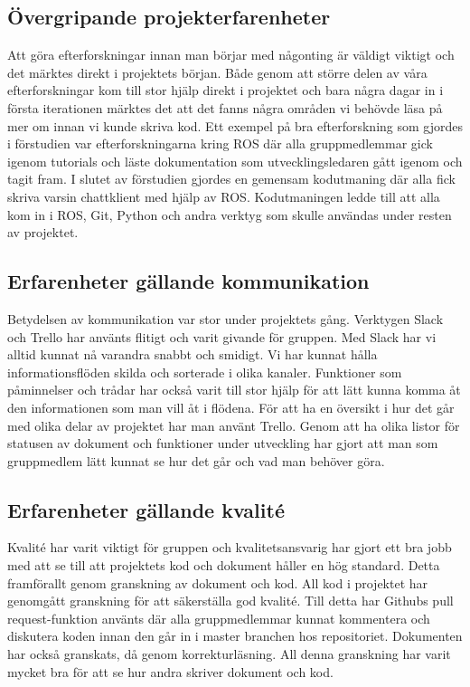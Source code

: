 \subsection{Övergripande projekterfarenheter}

Att göra efterforskningar innan man börjar med någonting är väldigt viktigt och det märktes direkt i projektets början. Både genom att större delen av våra efterforskningar kom till stor hjälp direkt i projektet och bara några dagar in i första iterationen märktes det att det fanns några områden vi behövde läsa på mer om innan vi kunde skriva kod. Ett exempel på bra efterforskning som gjordes i förstudien var efterforskningarna kring ROS där alla gruppmedlemmar gick igenom tutorials och läste dokumentation som utvecklingsledaren gått igenom och tagit fram. I slutet av förstudien gjordes en gemensam kodutmaning där alla fick skriva varsin chattklient med hjälp av ROS. Kodutmaningen ledde till att alla kom in i ROS, Git, Python och andra verktyg som skulle användas under resten av projektet.


\subsection{Erfarenheter gällande kommunikation}

Betydelsen av kommunikation var stor under projektets gång. Verktygen Slack och Trello har använts flitigt och varit givande för gruppen. Med Slack har vi alltid kunnat nå varandra snabbt och smidigt. Vi har kunnat hålla informationsflöden skilda och sorterade i olika kanaler. Funktioner som påminnelser och trådar har också varit till stor hjälp för att lätt kunna komma åt den informationen som man vill åt i flödena. För att ha en översikt i hur det går med olika delar av projektet har man använt Trello. Genom att ha olika listor för statusen av dokument och funktioner under utveckling har gjort att man som gruppmedlem lätt kunnat se hur det går och vad man behöver göra. 


\subsection{Erfarenheter gällande kvalité}

Kvalité har varit viktigt för gruppen och kvalitetsansvarig har gjort ett bra jobb med att se till att projektets kod och dokument håller en hög standard. Detta framförallt genom granskning av dokument och kod. All kod i projektet har genomgått granskning för att säkerställa god kvalité. Till detta har Githubs pull request-funktion använts där alla gruppmedlemmar kunnat kommentera och diskutera koden innan den går in i master branchen hos repositoriet. Dokumenten har också granskats, då genom korrekturläsning. All denna granskning har varit mycket bra för att se hur andra skriver dokument och kod.

